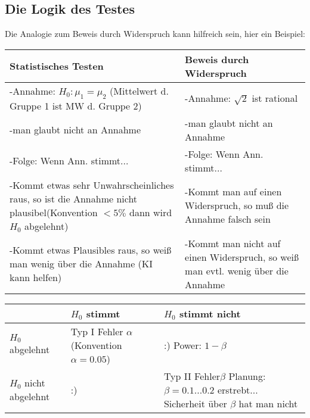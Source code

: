 \documentclass[10pt,a4paper]{article}
\theoremstyle{definition}
\begin{document}
\subsection{Die Logik des Testes}
Die Analogie zum Beweis durch Widerspruch kann hilfreich sein, hier ein Beispiel:\\
\begin{tabularx}{\linewidth}{|L|L|}  
\hline
Statistisches Testen & Beweis durch Widerspruch \\ \hline
-Annahme: $H_0: \mu_1 = \mu_2$ (Mittelwert d. Gruppe 1 ist MW d. Gruppe 2)  & -Annahme: $\sqrt{2}$ ist rational \\
-man glaubt nicht an Annahme & -man glaubt nicht an Annahme \\
-Folge: Wenn Ann. stimmt... & -Folge: Wenn Ann. stimmt... \\
-Kommt etwas sehr Unwahrscheinliches raus, so ist die Annahme nicht plausibel(Konvention $< 5\%$ dann wird $H_0$ abgelehnt) & -Kommt man auf einen Widerspruch, so muß die Annahme falsch sein \\
-Kommt etwas Plausibles raus, so weiß man wenig über die Annahme (KI kann helfen) & -Kommt man nicht auf einen Widerspruch, so weiß man evtl. wenig über die Annahme \\ \hline
\end{tabularx}
\begin{tabularx}{\linewidth}{|L|L|L|}
\hline
 & $H_0$ stimmt & $H_0$ stimmt nicht \\ \hline
 $H_0$ abgelehnt & Typ I Fehler \newline $\alpha$ \newline (Konvention $\alpha = 0.05$) & :) \newline Power: $1-\beta$ \\
 $H_0$ nicht abgelehnt & :) & Typ II Fehler\newline $\beta$ \newline Planung: $\beta=0.1 ... 0.2$ erstrebt... Sicherheit über $\beta$ hat man nicht \\ \hline
\end{tabularx}
\end{document}
